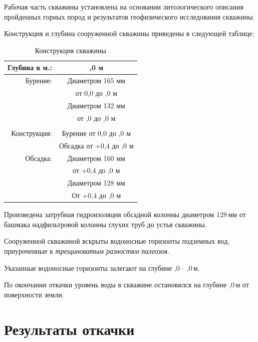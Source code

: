 \documentclass[a4paper,12pt]{article} %
\newcommand{\txtOgolovok}{+0,4}					%
\newcommand{\txtDepth}{,0}					%
\newcommand{\txtLevel}{,0}						%
\newcommand{\txtHorizDepth}{,0}				%
\newcommand{\txtGeology}{трещиноватым разностям палеозоя}
\newcommand{\txtCondDiam}{160}					%
\newcommand{\txtCondBtm}{,0}					%
\newcommand{\txtTubeDiam}{128}					%
\newcommand{\txtTubeBtm}{,0}					%
\newcommand{\txtHoleDiam}{132}					%
\begin{document}
Рабочая часть скважины установлена на основании литологического описания пройденных горных пород и результатов геофизического исследования скважины.

\newpage

Конструкция и глубина сооруженной скважины приведены в следующей таблице:

\bigskip

\begin{table}[!h]
	\caption{Конструкция скважины}
	\centering
\begin{tabular}{rc}
	\hline 
	Глубина в м.: & {\txtDepth} м \\ 
	\hline 
	Бурение: & Диаметром 165 мм \\ 
	& от 0,0 до {\txtCondBtm} м \\ 
	& Диаметром {\txtHoleDiam} мм \\ 
	& от {\txtCondBtm} до {\txtTubeBtm} м \\ 
	&  \\ 
	\hline 
	Конструкция: & Бурение от 0,0 до {\txtDepth} м \\ 
	& Обсадка от {\txtOgolovok} до {\txtTubeBtm} м \\ 
	\hline 
	Обсадка: & Диаметром {\txtCondDiam} мм \\ 
	& от {\txtOgolovok} до {\txtCondBtm} м \\ 
	& Диаметром {\txtTubeDiam} мм  \\ 
	& От {\txtOgolovok} до {\txtTubeBtm} м \\ 
	\hline 
\end{tabular} 
\end{table}

Произведена затрубная гидроизоляция обсадной колонны диаметром \txtTubeDiam \,мм от башмака надфильтровой колонны глухих труб до устья скважины.

Сооруженной скважиной вскрыты водоносные горизонты  подземных вод, приуроченные к \emph{\txtGeology}.

Указанные водоносные горизонты залегают на глубине   \txtHorizDepth \,– \txtDepth \,м.

По окончании откачки уровень воды в скважине остановился на глубине  \txtLevel \,м от поверхности земли.

\section*{Результаты откачки}
\end{document}
